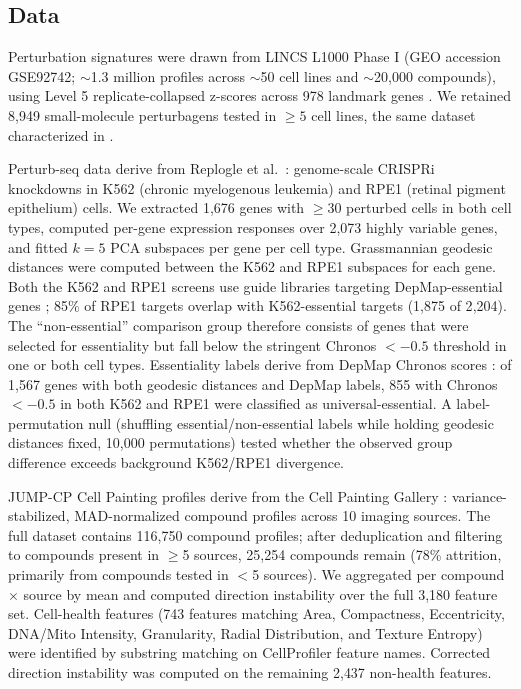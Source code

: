 \documentclass{article}
\begin{document}
\subsection{Data}

Perturbation signatures were drawn from LINCS L1000 Phase I (GEO accession
GSE92742; $\sim$1.3 million profiles across $\sim$50 cell lines and
$\sim$20{,}000 compounds), using Level 5 replicate-collapsed z-scores
across 978 landmark genes \citep{subramanian2017next}. We retained 8{,}949
small-molecule perturbagens tested in $\geq5$ cell lines, the same dataset
characterized in \citet{tower2026bracket}.

Perturb-seq data derive from Replogle et al.\
\citep{replogle2022mapping}: genome-scale CRISPRi knockdowns in K562
(chronic myelogenous leukemia) and RPE1 (retinal pigment epithelium)
cells. We extracted 1{,}676 genes with $\geq$30 perturbed cells in both
cell types, computed per-gene expression responses over 2{,}073 highly
variable genes, and fitted $k = 5$ PCA subspaces per gene per cell type.
Grassmannian geodesic distances were computed between the K562 and RPE1
subspaces for each gene. Both the K562 and RPE1 screens use guide libraries
targeting DepMap-essential genes \citep{replogle2022mapping}; 85\% of RPE1
targets overlap with K562-essential targets (1{,}875 of 2{,}204). The
``non-essential'' comparison group therefore consists of genes that were
selected for essentiality but fall below the stringent Chronos $< -0.5$
threshold in one or both cell types. Essentiality labels derive from
DepMap Chronos scores \citep{dempster2021chronos}: of 1{,}567 genes with
both geodesic distances and DepMap labels, 855 with Chronos $< -0.5$ in
both K562 and RPE1 were classified as universal-essential. A
label-permutation null (shuffling essential/non-essential labels while
holding geodesic distances fixed, 10{,}000 permutations) tested whether
the observed group difference exceeds background K562/RPE1 divergence.

JUMP-CP Cell Painting profiles derive from the Cell Painting Gallery
\citep{chandrasekaran2023jump}: variance-stabilized, MAD-normalized
compound profiles across 10 imaging sources. The full dataset contains
116{,}750 compound profiles; after deduplication and filtering to compounds
present in $\geq$5 sources, 25{,}254 compounds remain (78\% attrition,
primarily from compounds tested in $<$5 sources). We aggregated per
compound $\times$ source by mean and computed direction instability over
the full 3{,}180 feature set. Cell-health features (743 features matching Area, Compactness,
Eccentricity, DNA/Mito Intensity, Granularity, Radial Distribution, and
Texture Entropy) were identified by substring matching on CellProfiler
feature names. Corrected direction instability was computed on the remaining
2{,}437 non-health features.
\end{document}

